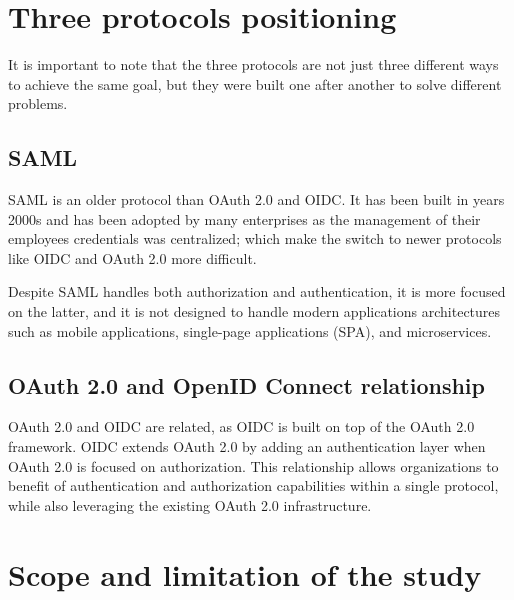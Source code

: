 \documentclass[../memoire.tex]{subfiles}
\begin{document}
\section{Three protocols positioning}

It is important to note that the three protocols are not just three different ways to achieve the same goal, but they were built one after another to solve different problems. 

\subsection{SAML}

SAML is an older protocol than OAuth 2.0 and OIDC\cite[p.~139]{wilson2022}. It has been built in years 2000s and has been adopted by many enterprises as the management of their employees credentials was centralized; which make the switch to newer protocols like OIDC and OAuth 2.0 more difficult. 

Despite SAML handles both authorization and authentication, it is more focused on the latter, and it is not designed to handle modern applications architectures such as mobile applications, single-page applications (SPA), and microservices. 


\subsection{OAuth 2.0 and OpenID Connect relationship}

OAuth 2.0 and OIDC are related, as OIDC is built on top of the OAuth 2.0 framework. OIDC extends OAuth 2.0 by adding an authentication layer when OAuth 2.0 is focused on authorization. This relationship allows organizations to benefit of authentication and authorization capabilities within a single protocol, while also leveraging the existing OAuth 2.0 infrastructure.

\section{Scope and limitation of the study}
\end{document}
